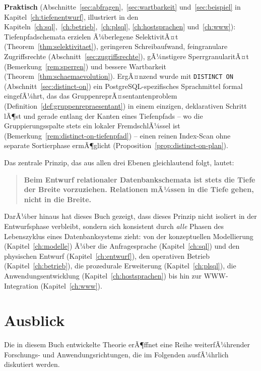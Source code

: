 ﻿\documentclass[a4paper,12pt]{report}
\theoremstyle{definition}
\theoremstyle{remark}
\begin{document}
\textbf{Praktisch} (Abschnitte~\ref{sec:abfragen},~\ref{sec:wartbarkeit}
und~\ref{sec:beispiel} in Kapitel~\ref{ch:tiefenentwurf}, illustriert
in den Kapiteln~\ref{ch:sql},~\ref{ch:betrieb},~\ref{ch:plsql},
\ref{ch:hostsprachen} und~\ref{ch:www}): Tiefenpfadschemata erzielen
Ã¼berlegene SelektivitÃ¤t (Theorem~\ref{thm:selektivitaet}), geringeren
Schreibaufwand, feingranulare Zugriffsrechte
(Abschnitt~\ref{sec:zugriffsrechte}), gÃ¼nstigere
SperrgranularitÃ¤t (Bemerkung~\ref{rem:sperren}) und bessere
Wartbarkeit (Theorem~\ref{thm:schaemaevolution}). ErgÃ¤nzend wurde mit
\texttt{DISTINCT ON} (Abschnitt~\ref{sec:distinct-on}) ein
PostgreSQL-spezifisches Sprachmittel formal eingefÃ¼hrt, das das
GruppenreprÃ¤sentantenproblem (Definition~\ref{def:gruppenrepraesentant})
in einem einzigen, deklarativen Schritt lÃ¶st und gerade entlang der
Kanten eines Tiefenpfads -- wo die Gruppierungsspalte stets ein
lokaler FremdschlÃ¼ssel ist (Bemerkung~\ref{rem:distinct-on-tiefenpfad})
-- einen reinen Index-Scan ohne separate Sortierphase ermÃ¶glicht
(Proposition~\ref{prop:distinct-on-plan}).

Das zentrale Prinzip, das aus allen drei Ebenen gleichlautend folgt,
lautet:

\begin{quote}
\large\bfseries
Beim Entwurf relationaler Datenbankschemata ist stets die Tiefe der
Breite vorzuziehen. Relationen mÃ¼ssen in die Tiefe gehen, nicht in die
Breite.
\end{quote}

DarÃ¼ber hinaus hat dieses Buch gezeigt, dass dieses Prinzip nicht isoliert
in der Entwurfsphase verbleibt, sondern sich konsistent durch
\emph{alle} Phasen des Lebenszyklus eines Datenbanksystems zieht: von
der konzeptuellen Modellierung (Kapitel~\ref{ch:modelle}) Ã¼ber die
Anfragesprache (Kapitel~\ref{ch:sql}) und den physischen Entwurf
(Kapitel~\ref{ch:entwurf}), den operativen Betrieb
(Kapitel~\ref{ch:betrieb}), die prozedurale Erweiterung
(Kapitel~\ref{ch:plsql}), die Anwendungsentwicklung
(Kapitel~\ref{ch:hostsprachen}) bis hin zur WWW-Integration
(Kapitel~\ref{ch:www}).

\section{Ausblick}
\label{sec:ausblick}

Die in diesem Buch entwickelte Theorie erÃ¶ffnet eine Reihe
weiterfÃ¼hrender Forschungs- und Anwendungsrichtungen, die im Folgenden
ausfÃ¼hrlich diskutiert werden.
\end{document}
